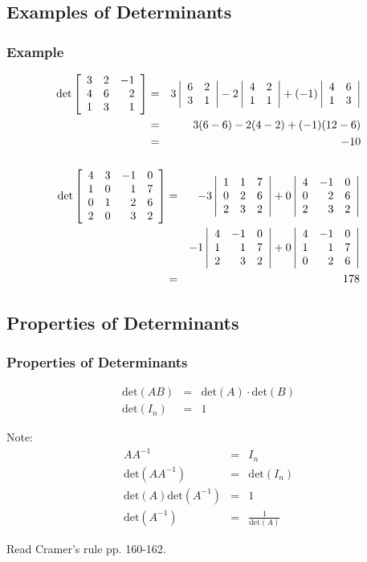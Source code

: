 \subsection{Examples of Determinants}

\begin{frame}
  \frametitle{Example}

  \begin{eqnarray*}
    \mathrm{det}
    \left[ \begin{array}{rrr} 3 & 2 & -1 \\ 4 & 6 & 2 \\ 1 & 3 & 1 \end{array} \right]
    & = & 
    3\left| \begin{array}{rr} 6 & 2 \\ 3 & 1 \end{array} \right| - 2 \left| \begin{array}{rr} 4 & 2 \\ 1 & 1 \end{array} \right| 
    + (-1) \left| \begin{array}{rr} 4 & 6 \\ 1 & 3 \end{array} \right| \\
    & = & 3 (6-6) - 2(4-2) + (-1) (12-6) \\
    & = & -10
  \end{eqnarray*}

\end{frame}


\begin{frame}
  \frametitle{}

  \begin{eqnarray*}
    \mathrm{det}
    \left[ \begin{array}{rrrr}
    4 & 3 & -1 & 0 \\ 
    1 & 0 & 1 & 7 \\ 
    0 & 1 & 2 & 6 \\ 
    2 & 0 & 3 & 2 \\ 
    \end{array} \right]
    & = & 
    -3 \left| \begin{array}{rrr} 1 & 1 & 7 \\ 0 & 2 & 6 \\ 2 & 3 & 2 \end{array} \right|
    + 0 \left| \begin{array}{rrr} 4 & -1 & 0 \\ 0 & 2 & 6 \\ 2 & 3 & 2 \end{array} \right| \\
    & & 
    - 1 \left| \begin{array}{rrr} 4 & -1 & 0 \\ 1 & 1 & 7 \\ 2 & 3 & 2 \end{array} \right|
    + 0 \left| \begin{array}{rrr} 4 & -1 & 0 \\ 1 & 1 & 7 \\ 0 & 2 & 6 \end{array} \right| \\
    & = & 178
  \end{eqnarray*}


\end{frame}


\subsection{Properties of Determinants}

\begin{frame}
  \frametitle{Properties of Determinants}

  \begin{eqnarray*}
    \mathrm{det}(AB) & = & \mathrm{det}(A) \cdot \mathrm{det}(B) \\
    \mathrm{det}(I_n) & = & 1
  \end{eqnarray*}

  Note:
  \begin{eqnarray*}
    A A^{-1} & = & I_n \\
    \mathrm{det}(A A^{-1}) & = & \mathrm{det}(I_n) \\
    \mathrm{det}(A) \mathrm{det}(A^{-1}) & = & 1 \\
    \mathrm{det}(A^{-1}) & = & \frac{1}{\mathrm{det}(A)}
  \end{eqnarray*}

  Read Cramer's rule pp. 160-162.

\end{frame}


